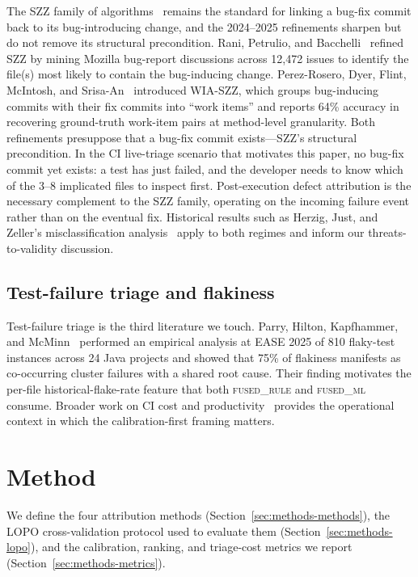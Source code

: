 \documentclass[preprint,12pt]{elsarticle}
\begin{document}
The SZZ family of algorithms~\cite{sliwerski2005,bird2009,herzig2013,rosa2021} remains the standard for linking a bug-fix commit back to its bug-introducing change, and the 2024--2025 refinements sharpen but do not remove its structural precondition. Rani, Petrulio, and Bacchelli~\cite{rani2024szzdiscussion} refined SZZ by mining Mozilla bug-report discussions across 12{,}472 issues to identify the file(s) most likely to contain the bug-inducing change. Perez-Rosero, Dyer, Flint, McIntosh, and Srisa-An~\cite{perezrosero2025wiaszz} introduced WIA-SZZ, which groups bug-inducing commits with their fix commits into ``work items'' and reports 64\% accuracy in recovering ground-truth work-item pairs at method-level granularity. Both refinements presuppose that a bug-fix commit exists---SZZ's structural precondition. In the CI live-triage scenario that motivates this paper, no bug-fix commit yet exists: a test has just failed, and the developer needs to know which of the 3--8 implicated files to inspect first. Post-execution defect attribution is the necessary complement to the SZZ family, operating on the incoming failure event rather than on the eventual fix. Historical results such as Herzig, Just, and Zeller's misclassification analysis~\cite{herzig2013} apply to both regimes and inform our threats-to-validity discussion.

\subsection{Test-failure triage and flakiness}

Test-failure triage is the third literature we touch. Parry, Hilton, Kapfhammer, and McMinn~\cite{parry2025systemic} performed an empirical analysis at EASE 2025 of 810 flaky-test instances across 24 Java projects and showed that 75\% of flakiness manifests as co-occurring cluster failures with a shared root cause. Their finding motivates the per-file historical-flake-rate feature that both \textsc{fused\_rule} and \textsc{fused\_ml} consume. Broader work on CI cost and productivity~\cite{vasilescu2018} provides the operational context in which the calibration-first framing matters.

\section{Method}
\label{sec:methods}

We define the four attribution methods (Section~\ref{sec:methods-methods}), the LOPO cross-validation protocol used to evaluate them (Section~\ref{sec:methods-lopo}), and the calibration, ranking, and triage-cost metrics we report (Section~\ref{sec:methods-metrics}).
\end{document}
